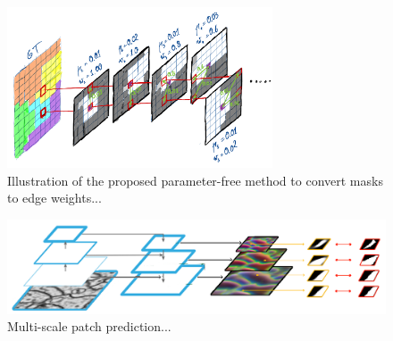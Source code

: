 \begin{figure}[t]
\centering
        \includegraphics[width=0.7\textwidth]{./figs/alg_explaned.jpg} %
        \caption{  Illustration of the proposed parameter-free method to convert \maskname masks to edge weights...}
    \label{fig:alg_explained}
\end{figure}

\begin{figure}[t]
\centering
        \includegraphics[width=\textwidth]{./figs/architecture.pdf} %
        \caption{ Multi-scale patch prediction...}
    \label{fig:comparing_masks_affs}
\end{figure}

